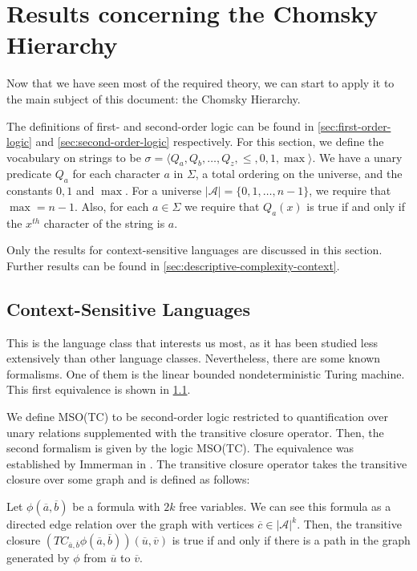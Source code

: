 \section{Results concerning the Chomsky Hierarchy}\label{sec:results-concerning-the-chomsky-hierarchy}

Now that we have seen most of the required theory, we can start to apply it to the main subject of this document: the Chomsky Hierarchy.

The definitions of first- and second-order logic can be found in \cref{sec:first-order-logic} and \cref{sec:second-order-logic} respectively.
For this section, we define the vocabulary on strings to be $\sigma = \langle Q_a, Q_b, \dots, Q_z, \leq , 0, 1, \max \rangle$.
We have a unary predicate $Q_a$ for each character $a$ in $\Sigma$, a total ordering on the universe, and the constants $0, 1$ and $\max$.
For a universe $| \mathcal{A} | = \{0, 1, \dots, n - 1\}$, we require that $\max = n - 1$.
Also, for each $a \in \Sigma$ we require that $Q_a(x)$ is true if and only if the $x^{th}$ character of the string is $a$.

Only the results for context-sensitive languages are discussed in this section.
Further results can be found in \cref{sec:descriptive-complexity-context}.

\subsection{Context-Sensitive Languages}\label{subsec:des-context-sensitive-languages}

This is the language class that interests us most, as it has been studied less extensively than other language classes.
Nevertheless, there are some known formalisms.
One of them is the linear bounded nondeterministic Turing machine.
This first equivalence is shown in \cref{subsec:des-context-sensitive-languages}.

We define MSO(TC) to be second-order logic restricted to quantification over unary relations supplemented with the transitive closure operator.
Then, the second formalism is given by the logic MSO(TC).
The equivalence was established by Immerman in \cite{Immerman1987}.
The transitive closure operator takes the transitive closure over some graph and is defined as follows:

\begin{define}
    Let $\phi\left(\overline{a}, \overline{b}\right)$ be a formula with $2k$ free variables.
    We can see this formula as a directed edge relation over the graph with vertices $\overline{c} \in | \mathcal{A} |^{k}$.
    Then, the transitive closure $\left(TC_{\overline{a}, \overline{b}}\phi\left(\overline{a}, \overline{b}\right)\right)\left(\overline{u}, \overline{v}\right)$ is true if and only if there is a path in the graph generated by $\phi$ from $\overline{u}$ to $\overline{v}$.
\end{define}


